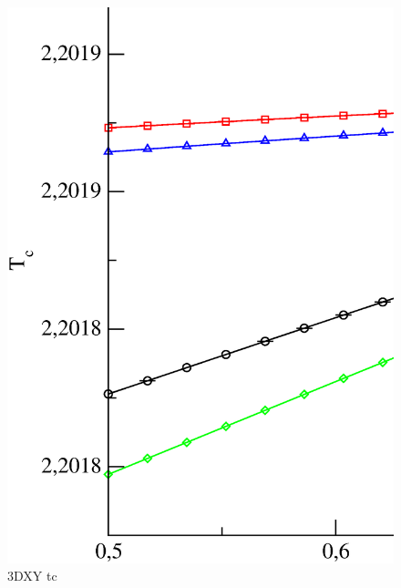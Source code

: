 \begin{figure}[!htpb]
  \centering
  \includegraphics[width=\textwidth]{./plots/3DXY/vsO/tc.eps}
  \caption{3DXY tc}
\end{figure}

